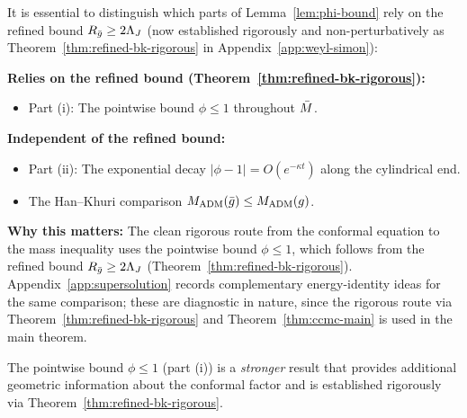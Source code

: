 \begin{remark}\label{rem:conditional-phi-bound}
It is essential to distinguish which parts of Lemma~\ref{lem:phi-bound} rely on the refined bound $R_{\bar{g}} \geq 2\Lambda_J$ (now established rigorously and non-perturbatively as Theorem~\ref{thm:refined-bk-rigorous} in Appendix~\ref{app:weyl-simon}):

\textbf{Relies on the refined bound (Theorem~\ref{thm:refined-bk-rigorous}):}
\begin{itemize}
\item Part (i): The pointwise bound $\phi \leq 1$ throughout $\bar{M}$.
\end{itemize}

\textbf{Independent of the refined bound:}
\begin{itemize}
\item Part (ii): The exponential decay $|\phi - 1| = O(e^{-\kappa t})$ along the cylindrical end.
\item The Han--Khuri comparison $M_{\mathrm{ADM}}(\bar{g}) \leq M_{\mathrm{ADM}}(g)$.
\end{itemize}

\textbf{Why this matters:} The clean rigorous route from the conformal equation to the mass inequality uses the pointwise bound $\phi \leq 1$, which follows from the refined bound $R_{\bar{g}}\geq 2\Lambda_J$ (Theorem~\ref{thm:refined-bk-rigorous}). Appendix~\ref{app:supersolution} records complementary energy-identity ideas for the same comparison; these are diagnostic in nature, since the rigorous route via Theorem~\ref{thm:refined-bk-rigorous} and Theorem~\ref{thm:ccmc-main} is used in the main theorem.

The pointwise bound $\phi \leq 1$ (part (i)) is a \emph{stronger} result that provides additional geometric information about the conformal factor and is established rigorously via Theorem~\ref{thm:refined-bk-rigorous}.
\end{remark}

